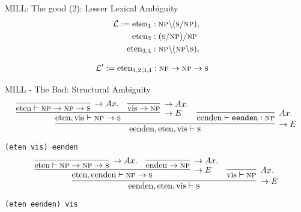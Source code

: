 \documentclass{beamer}
\newlength{\arrow}
\begin{document}
\begin{frame}{MILL: The good (2): Lesser Lexical Ambiguity}
\begin{align*}
\mathcal{L} := \text{eten}_1 &: \textsc{np}\backslash (\textsc{s}/\textsc{np}), \\
			\text{eten}_2 &: (\textsc{s}/\textsc{np})/\textsc{np} \\
			\text{eten}_{3,4} &: \textsc{np}\backslash (\textsc{np}\backslash \textsc{s}), \\
\end{align*}

\pause
\begin{align*}
\mathcal{L}' := \text{eten}_{1,2,3,4} &: \textsc{np} \to \textsc{np} \to \textsc{s}
\end{align*}

	
\large
\center
\smiley
	\vfill 

\end{frame}


\begin{frame}{MILL - The Bad: Structural Ambiguity}
\small
\vfill
\[
\infer[\rightarrow E]{\text{eenden}, \text{eten}, \text{vis} \vdash \textsc{s}}{
	\infer[\rightarrow E]{\text{eten}, \text{vis} \vdash \textsc{np} \to \textsc{s}}{
		\infer[\rightarrow Ax.]{\text{eten} \vdash \textsc{np} \to \textsc{np} \to \textsc{s}}{}
		&
		\infer[\rightarrow Ax.]{\text{vis} \to \textsc{np}}{}
		}
	&
	\infer[Ax.]{\text{eenden} \vdash \texttt{eenden}: \textsc{np}}{}			
}
\]	
\center \texttt{(eten vis) eenden}
\vfill
\[
\infer[\rightarrow E]{\text{eenden}, \text{eten}, \text{vis} \vdash \textsc{s}}{
\infer[\rightarrow E]{\text{eten}, \text{eenden} \vdash \textsc{np} \to \textsc{s}}{
	\infer[\rightarrow Ax.]{\text{eten} \vdash \textsc{np} \to \textsc{np} \to \textsc{s}}{}
	&
	\infer[\rightarrow Ax.]{\text{enden} \to \textsc{np}}{}
	}
&
\infer[Ax.]{\text{vis} \vdash \textsc{np}}{}			
}
\]
\texttt{(eten eenden) vis}

\large
\frownie
\vfill
\end{frame}
\end{document}
